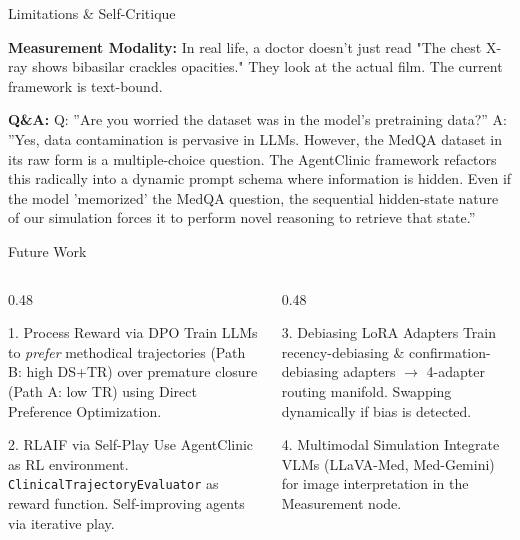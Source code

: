\documentclass[aspectratio=169,11pt]{beamer}
\begin{document}
\begin{frame}{Limitations \& Self-Critique}
{\textbf{Measurement Modality:} In real life, a doctor doesn't just read "The chest X-ray shows bibasilar crackles opacities." They look at the actual film. The current framework is text-bound.

\textbf{Q\&A:}
Q: ''Are you worried the dataset was in the model's pretraining data?''
A: ''Yes, data contamination is pervasive in LLMs. However, the MedQA dataset in its raw form is a multiple-choice question. The AgentClinic framework refactors this radically into a dynamic prompt schema where information is hidden. Even if the model 'memorized' the MedQA question, the sequential hidden-state nature of our simulation forces it to perform novel reasoning to retrieve that state.''
}
\end{frame}

\begin{frame}{Future Work}
\begin{columns}[T]
\begin{column}{0.48\textwidth}
\begin{block}{1. Process Reward via DPO}
\small
Train LLMs to \textit{prefer} methodical trajectories (Path B: high DS+TR) over premature closure (Path A: low TR) using Direct Preference Optimization.
\end{block}
\vspace{0.3em}
\begin{block}{2. RLAIF via Self-Play}
\small
Use AgentClinic as RL environment. \texttt{ClinicalTrajectoryEvaluator} as reward function. Self-improving agents via iterative play.
\end{block}
\end{column}
\begin{column}{0.48\textwidth}
\begin{block}{3. Debiasing LoRA Adapters}
\small
Train recency-debiasing \& confirmation-debiasing adapters $\rightarrow$ 4-adapter routing manifold. Swapping dynamically if bias is detected.
\end{block}
\vspace{0.3em}
\begin{block}{4. Multimodal Simulation}
\small
Integrate VLMs (LLaVA-Med, Med-Gemini) for image interpretation in the Measurement node.
\end{block}
\end{column}
\end{columns}

\end{frame}
\end{document}
